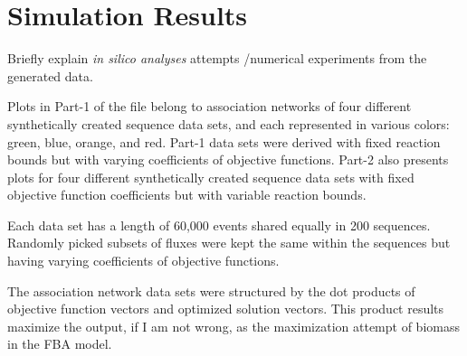 \section{Simulation Results}
{\color{red} 
	
	Briefly explain \emph{in silico analyses} attempts /numerical experiments from the generated data.
	
	Plots in Part-1 of the file belong to association networks of four different synthetically created sequence data sets, and each represented in various colors: green, blue, orange, and red. Part-1 data sets were derived with fixed reaction bounds but with varying coefficients of objective functions. Part-2 also presents plots for four different synthetically created sequence data sets with fixed objective function coefficients but with variable reaction bounds.
	
	Each data set has a length of 60,000 events shared equally in 200 sequences. Randomly picked subsets of fluxes were kept the same within the sequences but having varying coefficients of objective functions.
	
	The association network data sets were structured by the dot products of objective function vectors and optimized solution vectors. This product results maximize the output, if I am not wrong, as the maximization attempt of biomass in the FBA model.
}








